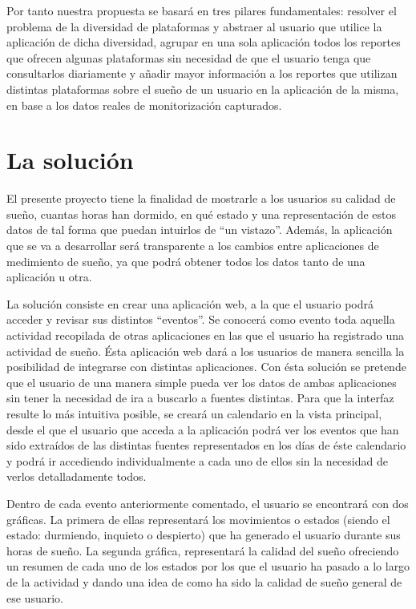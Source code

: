 \documentclass[11pt,openany]{book}
\begin{document}
Por tanto nuestra propuesta se basará en tres pilares fundamentales: resolver el problema de la diversidad de plataformas y abstraer al usuario que utilice la aplicación de dicha diversidad, agrupar en una sola aplicación todos los reportes que ofrecen algunas plataformas sin necesidad de que el usuario tenga que consultarlos diariamente y añadir mayor información a los reportes que utilizan distintas plataformas sobre el sueño de un usuario en la aplicación de la misma, en base a los datos reales de monitorización capturados.

\section{La solución}

El presente proyecto tiene la finalidad de mostrarle a los usuarios su calidad de sueño, cuantas horas han dormido, en qué estado y una representación de estos datos de tal forma que puedan intuirlos de ``un vistazo''. Además, la aplicación que se va a desarrollar será transparente a los cambios entre aplicaciones de medimiento de sueño, ya que podrá obtener todos los datos tanto de una aplicación u otra.

La solución consiste en crear una aplicación web, a la que el usuario podrá acceder y revisar sus distintos ``eventos''. Se conocerá como evento toda aquella actividad recopilada de otras aplicaciones en las que el usuario ha registrado una actividad de sueño. Ésta aplicación web dará a los usuarios de manera sencilla la posibilidad de integrarse con distintas aplicaciones. Con ésta solución se pretende que el usuario de una manera simple pueda ver los datos de ambas aplicaciones sin tener la necesidad de ira a buscarlo a fuentes distintas. Para que la interfaz resulte lo más intuitiva posible, se creará un calendario en la vista principal, desde el que el usuario que acceda a la aplicación podrá ver los eventos que han sido extraídos de las distintas fuentes representados en los días de éste calendario y podrá ir accediendo individualmente a cada uno de ellos sin la necesidad de verlos detalladamente todos. 

Dentro de cada evento anteriormente comentado, el usuario se encontrará con dos gráficas. La primera de ellas representará los movimientos o estados (siendo el estado: durmiendo, inquieto o despierto) que ha generado el usuario durante sus horas de sueño. La segunda gráfica, representará la calidad del sueño ofreciendo un resumen de cada uno de los estados por los que el usuario ha pasado a lo largo de la actividad y dando una idea de como ha sido la calidad de sueño general de ese usuario.
\end{document}
